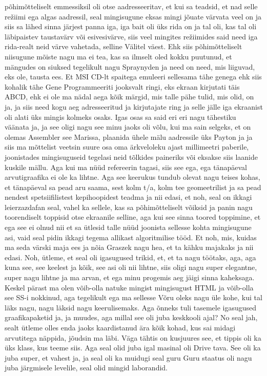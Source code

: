 põhimõtteliselt emmessiksil oli otse aadresseeritav, et kui sa teadsid, et nad selle režiimi ega algas aadressil, seal mingisugune eksas mingi jõuate värvata veel on ja siis sa lähed sinna järjest panna iga, iga bait oli üks rida on ja tal oli, kas tal oli läbipaistev taustavärv või esivesivärve, siis veel mingites režiimides said need iga rida-realt neid värve vahetada, selline Välitel väest. Ehk siis põhimõtteliselt niisugune mõiste nagu ma ei tea, kas sa ilmselt oled kokku puutunud, et mängudes on siuksed tegelikult nagu Spraynyden ja need on need, mis liiguvad, eks ole, tausta ees. Et MSI CD-lt spaitega emuleeri sellesama tähe genega ehk siis kohalik tähe Gene Programmeeriti jooksvalt ringi, eks ekraan kirjutati täis ABCD, ehk ei ole ma nädal aega kõik märgid, mis talle pähe tulid, mis olid, on ja, ja siis need kogu aeg adresseeritud ja kirjutajate ring ja selle jälle iga ekraanist oli alati üks mingis kolmeks osaks. Igas osas sa said eri eri nagu tähestiku väänata ja, ja see oligi nagu see minu jaoks oli võlu, kui ma sain selgeks, et on olemas Assembler see Marissa, plaanida ühele mälu aadressile üks Payton ja ja siis ma mõttelist veetsin suure osa oma ärkveloleku ajast millimeetri paberile, joonistades mingisuguseid tegelasi neid tõlkides paineriks või eksakse siis laanide kuskile mällu. Aga kui ma nüüd refereerin tagasi, siis see ega, ega tänapäeval arvutigraafika ei ole ka lihtne. Aga see keerukus tundub olevat nagu teises kohas, et tänapäeval sa pead aru saama, sest kolm t/a, kolm tee geomeetrilist ja sa pead nendest spetsiifilistest kepihoopidest teadma ja nii edasi, et noh, seal on ikkagi leierzazdafan seal, vahel ka sellele, kas sa põhimõtteliselt võiksid ja panin nagu toorendiselt toppisid otse ekraanile selline, aga kui see sinna toored toppimine, et ega see ei olnud nii et sa ütlesid talle nüüd joonista sellesse kohta mingisugune asi, vaid seal pidin ikkagi tegema allikast algoritmilise tööd. Et noh, mis, kuidas ma seda värski maja ees ja nõia Graszek nagu hea, et ta kähku majakaks ja nii edasi. Noh, ütleme, et seal oli igasugused trikid, et, et ta nagu töötaks, aga, aga kuna see, see keelest ja kõik, see asi oli nii lihtne, siis oligi nagu super elegantne, super nagu lihtne ja ma arvan, et ega minu progemis aeg jäigi sinna kaheksaga.
Keskel pärast ma olen võib-olla natuke mingist mingisugust HTML ja võib-olla see SS-i nokkinud, aga tegelikult ega ma sellesse Võru oleks nagu üle kohe, kui tal läks nagu, nagu läksid nagu keerulisemaks. Aga õnneks tuli tasemele igasugused graafikapaketid ja, ja muudes, aga millal see oli juba keskkooli ajal? No seal jah, sealt ütleme olles enda jaoks kaardistanud ära kõik kohad, kus sai midagi arvutitega näppida, jõudsin ma läbi. Väga tähtis on kusjuures see, et tippis oli ka üks klass, kus teeme siis. Aga seal olid juba igal masinal oli Drive tava. See oli ka juba super, et vahest ja, ja seal oli ka muidugi seal guru Guru staatus oli nagu juba järgmisele levelile, seal olid mingid laborandid.
